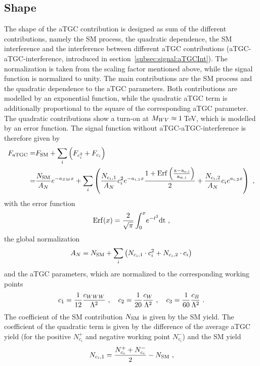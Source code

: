 \subsection*{Shape}
The shape of the aTGC contribution is designed as sum of the different contributions, namely the SM process, the quadratic dependence, the SM interference and the interference between different aTGC contributions (aTGC-aTGC-interference, introduced in section~\ref{subsec:signal:aTGCInt}). The normalization is taken from the scaling factor mentioned above, while the signal function is normalized to unity. The main contributions are the SM process and the quadratic dependence to the aTGC parameters. Both contributions are modelled by an exponential function, while the quadratic aTGC term is additionally proportional to the square of the corresponding aTGC parameter. The quadratic contributions show a turn-on at $M_{WV} \approx 1$\,TeV, which is modelled by an error function. The signal function without aTGC-aTGC-interference is therefore given by
\begin{align}
F_{\rm aTGC} =& F_{\rm SM} + \sum_i \left( F_{c_i^2} + F_{c_i} \right) \\
=& \frac{N_{\rm SM}}{A_N} e^{-a_{SM}x} + \sum_i \left( \frac{N_{c_i,1}}{A_N} c_i^2 e^{-a_{i,1} x} \frac{1+\rm{Erf}\left(\frac{x-a_{o,i}}{a_{w,i}}\right)}{2} + \frac{N_{c_i,2}}{A_N} c_i e^{a_{i,2}x} \right)  ~,
\label{eq:signal:sigfunc}
\end{align}
with the error function
\begin{equation}
{\rm Erf}(x) = \frac{2}{\sqrt{\pi}}\int_0^x \! e^{-t^2}{\rm dt} ~,
\end{equation}
the global normalization
\begin{equation}
A_N = N_{\rm SM} + \sum_i \left( N_{c_i,1}\cdot c_i^2 + N_{c_i,2}\cdot c_i \right) 
\label{eq:signal:globnorm}
\end{equation} 
and the aTGC parameters, which are normalized to the corresponding working points
\begin{equation}
c_1 = \frac{1}{12}\frac{c_{WWW}}{\Lambda^2} ~ , \quad c_2 = \frac{1}{20}\frac{c_{W}}{\Lambda^2} ~ , \quad c_3 = \frac{1}{60}\frac{c_{B}}{\Lambda^2} ~.
\end{equation}
The coefficient of the SM contribution $N_{\rm SM}$ is given by the SM yield. The coefficient of the quadratic term is given by the difference of the average aTGC yield (for the positive $N_{c_i}^{+}$ and negative working point $N_{c_i}^{-}$) and the SM yield
\begin{equation}
N_{c_i,1} = \frac{N_{c_i}^{+}+N_{c_i}^{-}}{2}-N_{\rm SM} ~,
\label{eq:signal:n1}
\end{equation}
